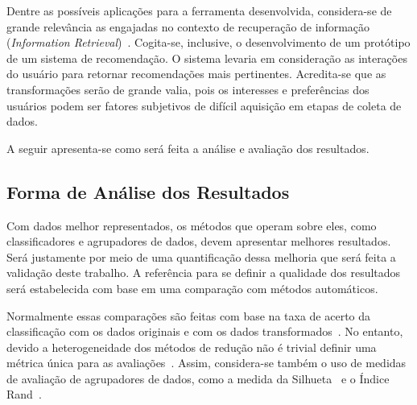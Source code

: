 Dentre as possíveis aplicações para a ferramenta
desenvolvida, considera-se de grande relevância as
engajadas no contexto de recuperação de informação
(\emph{Information Retrieval})~\cite{Manning2008}.
Cogita-se, inclusive, o desenvolvimento de um protótipo de um
sistema de recomendação. O sistema levaria em consideração
as interações do usuário para retornar recomendações mais
pertinentes. Acredita-se que as transformações serão de
grande valia, pois os interesses e preferências dos usuários
podem ser fatores subjetivos de difícil aquisição em etapas
de coleta de dados.

A seguir apresenta-se como será feita a análise e avaliação
dos resultados.

\subsection{Forma de Análise dos Resultados}

Com dados melhor representados, os métodos que operam sobre
eles, como classificadores e agrupadores de dados, devem
apresentar melhores resultados. Será justamente por meio de uma
quantificação dessa melhoria que será feita a validação 
deste trabalho. A referência para se definir a qualidade dos
resultados será estabelecida com base em uma comparação com
métodos automáticos.

Normalmente essas comparações são feitas com base na taxa de
acerto da classificação com os dados originais e com os
dados transformados~\cite{Guyon2003,Joshi2007}. No entanto,
devido a heterogeneidade dos métodos de redução não é
trivial definir uma métrica única para as
avaliações~\cite{Medeiros2011}. Assim, considera-se também o
uso de medidas de avaliação de agrupadores de dados, como a
medida da Silhueta~\cite{Rousseeuw1987} e o Índice
Rand~\cite{Rand1971}.
